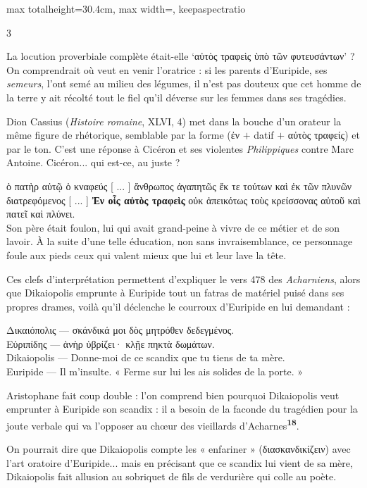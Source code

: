 \documentclass[11pt,twoside]{book}
\newcommand{\italique}[1]{\textit{#1}}
\newcommand{\citComm}[1]{\begin{quoting}[vskip=0.4pt,leftmargin=0.7em,rightmargin=0.2em]#1\end{quoting}}
\newcommand{\francais}[1]{{\policeFr #1}}
\newcommand{\marqueur}[1]{\textsuperscript{\color{rubricRed}\textbf{#1}}}
\begin{document}
\begin{adjustbox}{max totalheight=30.4cm, max width=\textwidth, keepaspectratio}
\begin{minipage}{\textwidth}
{\begin{multicols}{3}
\par\vspace{1.5pt}
\noindent La locution proverbiale complète était-elle `αὐτὸς τραφεὶς ὑπὸ τῶν φυτευσάντων' ? On comprendrait où veut en venir l'oratrice : si les parents d'Euripide, ses \italique{semeurs}, l'ont semé au milieu des légumes, il n'est pas douteux que cet homme de la terre y ait récolté tout le fiel qu'il déverse sur les femmes dans ses tragédies.
\par\vspace{1.5pt}
\noindent Dion Cassius (\italique{Histoire romaine}, XLVI, 4) met dans la bouche d'un orateur la même figure de rhétorique, semblable par la forme (ἐν $+$ datif $+$ αὐτὸς τραφείς) et par le ton. C'est une réponse à Cicéron et ses violentes \italique{Philippiques} contre Marc Antoine. Cicéron... qui est-ce, au juste ?
\citComm{ὁ πατὴρ αὐτῷ ὁ κναφεύς [ ... ] ἄνθρωπος ἀγαπητῶς ἔκ τε τούτων καὶ ἐκ τῶν πλυνῶν διατρεφόμενος [ ... ] \textbf{Ἐν οἷς αὐτὸς τραφεὶς} οὐκ ἀπεικότως τοὺς κρείσσονας αὐτοῦ καὶ πατεῖ καὶ πλύνει.\\
\francais{Son père était foulon, lui qui avait grand-peine à vivre de ce métier et de son lavoir. À la suite d'une telle éducation, non sans invraisemblance, ce personnage foule aux pieds ceux qui valent mieux que lui et leur lave la tête.}}
\par\vspace{1.5pt}
\noindent Ces clefs d'interprétation permettent d'expliquer le vers 478 des \italique{Acharniens}, alors que Dikaiopolis emprunte à Euripide tout un fatras de matériel puisé dans ses propres drames, voilà qu'il déclenche le courroux d'Euripide en lui demandant :
\citComm{Δικαιόπολις --- σκάνδικά μοι δὸς μητρόθεν δεδεγμένος.\\
Εὐριπίδης --- ἁνὴρ ὑβρίζει· κλῇε πηκτὰ δωμάτων.\\
Dikaiopolis --- Donne-moi de ce scandix que tu tiens de ta mère.\\
Euripide --- Il m'insulte. « Ferme sur lui les ais solides de la porte. »}
\par\vspace{1.5pt}
\noindent Aristophane fait coup double : l'on comprend bien pourquoi Dikaiopolis veut emprunter à Euripide son scandix : il a besoin de la faconde du tragédien pour la joute verbale qui va l'opposer au chœur des vieillards d'Acharnes\marqueur{18}.
\par\vspace{1.5pt}
\noindent On pourrait dire que Dikaiopolis compte les « enfariner » (διασκανδικίζειν) avec l'art oratoire d'Euripide... mais en précisant que ce scandix lui vient de sa mère, Dikaiopolis fait allusion au sobriquet de fils de verdurière qui colle au poète.

\end{multicols}}
\end{minipage}
\end{adjustbox}
\end{document}
